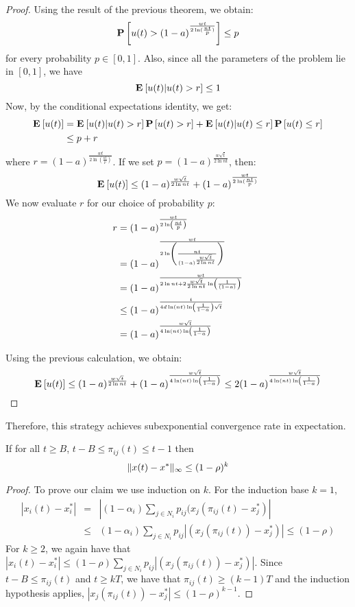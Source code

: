 \begin{proof}
Using the result of the previous theorem, we obtain:
$$ \bm{\mathrm{P}}\left[u(t) > (1-a)^{\frac{wt}{2\ln( \frac{nt}{p})} }\right] \leq p $$
for every probability $p \in [0,1]$. Also, since all the parameters of the problem lie in $[0,1]$, we have 
$$\Exp{u(t)|u(t) > r} \leq 1$$
Now, by the conditional expectations identity, we get:
\begin{align*}
\Exp{u(t)} &= \Exp{u(t)|u(t) > r}\Prob{u(t) > r} +\Exp{u(t)|u(t) \leq r}\Prob{u(t) \leq r}\\
&\leq p + r 
\end{align*}
where $r = (1-a)^{\frac{wt}{2\ln( \frac{nt}{p})} }$. If we set $p = (1-a)^{\frac{w\sqrt{t}}{2\ln nt}}$, then:
$$
\Exp{u(t)} \leq (1-a)^{\frac{w\sqrt{t}}{2\ln nt}} + (1-a)^{\frac{wt}{2\ln( \frac{nt}{p})} }
$$
We now evaluate $r$ for our choice of probability $p$:
\begin{align*}
r 
&= (1-a)^{\frac{wt}{2\ln\left( \frac{nt}{p}\right)} }\\
&= (1-a)^{\frac{wt}{2\ln\left( \frac{nt}{(1-a)^{\frac{w\sqrt{t}}{2\ln nt}}}\right)} }\\
&= (1-a)^{\frac{wt}{2\ln nt + 2\frac{w\sqrt{t}}{2\ln nt}\ln\left( \frac{1}{(1-a)}\right) }}\\
&\leq (1-a)^{\frac{t}{4d\ln(nt)\ln\left( \frac{1}{1-a}\right) \sqrt{t}}}\\
&= (1-a)^{\frac{w\sqrt{t}}{4\ln(nt)\ln\left( \frac{1}{1-a}\right)}}
\end{align*}

Using the previous calculation, we obtain:
$$ \Exp{u(t)} \leq (1-a)^{\frac{w\sqrt{t}}{2\ln nt}} + (1-a)^{\frac{w\sqrt{t}}{4\ln(nt)\ln\lp( \frac{1}{1-a}\rp)}} \leq 2(1-a)^{\frac{w\sqrt{t}}{4\ln(nt)\ln\lp( \frac{1}{1-a}\rp)}}$$
\end{proof}
Therefore, this strategy achieves subexponential convergence rate in expectation. 

\begin{lemma}\label{l:simple_induction}
If for all $t\geq B$, $t-B \leq \pi_{ij}(t) \leq t-1$ then
\[\| x(t) - x^* \|_{\infty} \leq (1-\rho)^k\]
\end{lemma}

\begin{proof}
To prove our claim we use induction on $k$. For the induction base $k=1$, 
\begin{eqnarray*}
|x_i(t) - x_i^*| &=& |(1-\alpha_i)\sum_{j \in N_i}p_{ij}(x_j(\pi_{ij}(t)-x_j^*)|\\
&\leq& (1-\alpha_i)\sum_{j \in N_i}p_{ij}|(x_j(\pi_{ij}(t))-x_j^*)|\leq (1-\rho)
\end{eqnarray*}
For $k\geq 2$, we again have that $|x_i(t) - x_i^*|\leq (1-\rho)\sum_{j \in N_i}p_{ij}|(x_j(\pi_{ij}(t))-x_j^*)|$.
Since $t-B \leq \pi_{ij}(t)$ and $t\geq kT$, we have that $\pi_{ij}(t) \geq (k-1)T$ and the induction hypothesis applies,
$|x_j(\pi_{ij}(t))-x_j^*| \leq (1-\rho)^{k-1}$.
\end{proof}




